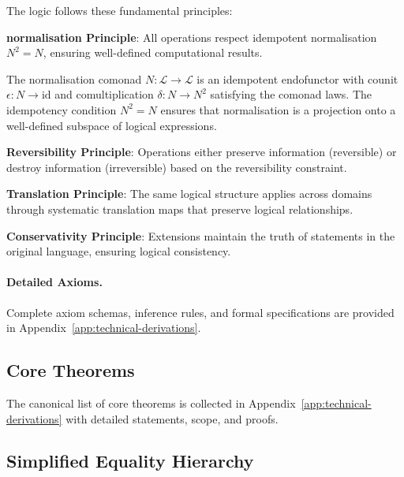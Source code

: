 \begin{definition}
\label{def:design-principles}
The logic follows these fundamental principles:

\textbf{normalisation Principle}: All operations respect idempotent normalisation $N^2 = N$, ensuring well-defined computational results.

\begin{definition}
\label{def:normalisation-comonad}
The normalisation comonad $N: \mathcal{L} \to \mathcal{L}$ is an idempotent endofunctor with counit $\epsilon: N \to \text{id}$ and comultiplication $\delta: N \to N^2$ satisfying the comonad laws. The idempotency condition $N^2 = N$ ensures that normalisation is a projection onto a well-defined subspace of logical expressions.
\end{definition}

\textbf{Reversibility Principle}: Operations either preserve information (reversible) or destroy information (irreversible) based on the reversibility constraint.

\textbf{Translation Principle}: The same logical structure applies across domains through systematic translation maps that preserve logical relationships.

\textbf{Conservativity Principle}: Extensions maintain the truth of statements in the original language, ensuring logical consistency.
\end{definition}

\paragraph{Detailed Axioms.} Complete axiom schemas, inference rules, and formal specifications are provided in Appendix~\ref{app:technical-derivations}.

\subsection{Core Theorems}

The canonical list of core theorems is collected in Appendix~\ref{app:technical-derivations} with detailed statements, scope, and proofs. 

\subsection{Simplified Equality Hierarchy}

